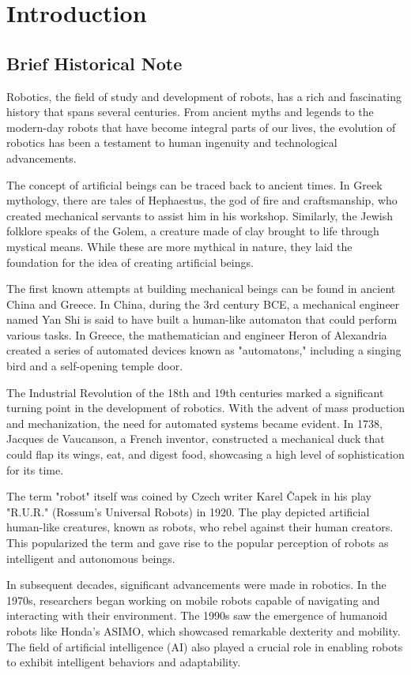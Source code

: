 \chapter{Introduction}
\section{Brief Historical Note}
Robotics, the field of study and development of robots, has a rich and fascinating history that spans several centuries. From ancient myths and legends to the modern-day robots that have become integral parts of our lives, the evolution of robotics has been a testament to human ingenuity and technological advancements.

The concept of artificial beings can be traced back to ancient times. In Greek mythology, there are tales of Hephaestus, the god of fire and craftsmanship, who created mechanical servants to assist him in his workshop. Similarly, the Jewish folklore speaks of the Golem, a creature made of clay brought to life through mystical means. While these are more mythical in nature, they laid the foundation for the idea of creating artificial beings.

The first known attempts at building mechanical beings can be found in ancient China and Greece. In China, during the 3rd century BCE, a mechanical engineer named Yan Shi is said to have built a human-like automaton that could perform various tasks. In Greece, the mathematician and engineer Heron of Alexandria created a series of automated devices known as "automatons," including a singing bird and a self-opening temple door.

The Industrial Revolution of the 18th and 19th centuries marked a significant turning point in the development of robotics. With the advent of mass production and mechanization, the need for automated systems became evident. In 1738, Jacques de Vaucanson, a French inventor, constructed a mechanical duck that could flap its wings, eat, and digest food, showcasing a high level of sophistication for its time.

The term "robot" itself was coined by Czech writer Karel Čapek in his play "R.U.R." (Rossum's Universal Robots) in 1920. The play depicted artificial human-like creatures, known as robots, who rebel against their human creators. This popularized the term and gave rise to the popular perception of robots as intelligent and autonomous beings.

In subsequent decades, significant advancements were made in robotics. In the 1970s, researchers began working on mobile robots capable of navigating and interacting with their environment. The 1990s saw the emergence of humanoid robots like Honda's ASIMO, which showcased remarkable dexterity and mobility. The field of artificial intelligence (AI) also played a crucial role in enabling robots to exhibit intelligent behaviors and adaptability.

